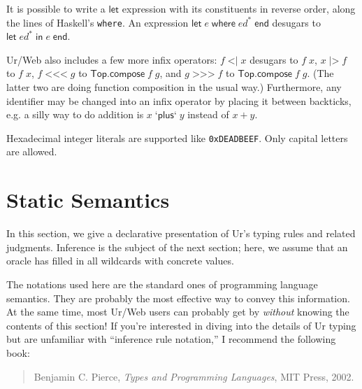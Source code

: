 \documentclass{article}
\newcommand{\cd}[1]{\texttt{#1}}
\newcommand{\mt}[1]{\mathsf{#1}}
\begin{document}
It is possible to write a $\mt{let}$ expression with its constituents in reverse order, along the lines of Haskell's \cd{where}.  An expression $\mt{let} \; e \; \mt{where} \; ed^* \; \mt{end}$ desugars to $\mt{let} \; ed^* \; \mt{in} \; e \; \mt{end}$.

Ur/Web also includes a few more infix operators: $f \; \texttt{<|} \; x$ desugars to $f \; x$, $x \; \texttt{|>} \; f$ to $f \; x$, $f \; \texttt{<{}<{}<} \; g$ to $\mt{Top}.\mt{compose} \; f \; g$, and $g \; \texttt{>{}>{}>} \; f$ to $\mt{Top}.\mt{compose} \; f \; g$.  (The latter two are doing function composition in the usual way.)  Furthermore, any identifier may be changed into an infix operator by placing it between backticks, e.g. a silly way to do addition is $x \; \texttt{`}\mt{plus}\texttt{`} \; y$ instead of $x + y$.

Hexadecimal integer literals are supported like \texttt{0xDEADBEEF}.  Only capital letters are allowed.


\section{Static Semantics}

In this section, we give a declarative presentation of Ur's typing rules and related judgments.  Inference is the subject of the next section; here, we assume that an oracle has filled in all wildcards with concrete values.

The notations used here are the standard ones of programming language semantics.  They are probably the most effective way to convey this information.  At the same time, most Ur/Web users can probably get by \emph{without} knowing the contents of this section!  If you're interested in diving into the details of Ur typing but are unfamiliar with ``inference rule notation,'' I recommend the following book:
\begin{quote}
  Benjamin C. Pierce, \emph{Types and Programming Languages}, MIT Press, 2002.
\end{quote}
\end{document}
